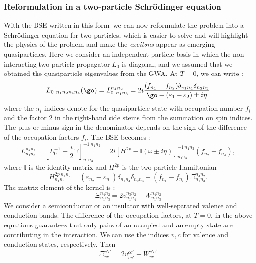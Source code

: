 \subsubsection{Reformulation in a two-particle Schrödinger equation}
With the \gls{BSE} written in this form, we can now reformulate the problem into a Schrödinger equation for two particles, which is easier to solve and will highlight the physics of the problem and make the \textit{excitons} appear as emerging quasiparticles. Here we consider an independent-particle basis in which the non-interacting two-particle propagator $L_0$ is diagonal, and we assumed that we obtained the quasiparticle eigenvalues from the \gls{GWA}. At $T=0$, we can write :
\begin{equation}
	L_{0\ n_1n_2n_3n_4}(\go) = L_{0\ n_1n_3}^{n_4n_2} = 2 i \frac{(f_{n_1} - f_{n_2}) \delta_{n_1n_4}\delta_{n_2n_3}}{\go - (\varepsilon_1 - \varepsilon_2) \pm i\eta}
\end{equation}
where the $n_i$ indices denote for the quasiparticle state with occupation number $f_i$ and the factor 2 in the right-hand side stems from the summation on spin indices. The plus or minus sign in the denominator depends on the sign of the difference of the occupation factors $f_i$. The \gls{BSE} becomes :
\begin{equation}
	L_{n_1n_3}^{n_4n_2} = \left[ L_0^{-1} + \frac{i}{2}\Xi\right]^{-1\ n_4n_2}_{n_1n_3} = 2i \left[ H^{2p} - \mathbb{I}(\omega \pm i\eta) \right]^{-1\ n_4n_2}_{n_1n_3}(f_{n_2} - f_{n_4}),
\end{equation}
where $\mathbb{I}$ is the identity matrix and $H^{2p}$ is the two-particle Hamiltonian 
\begin{equation}
	H^{2p\ n_4n_2}_{n_1n_3} = (\varepsilon_{n_2} - \varepsilon_{n_1}) \delta_{n_1n_4}\delta_{n_2n_3} + (f_{n_1} - f_{n_3}) \Xi_{n_1n_3}^{n_4n_2}.
\end{equation}
The matrix element of the kernel is :
\begin{equation}
	\Xi_{n_1n_3}^{n_4n_2} = 2v_{n_1n_4}^{n_3n_2} - W_{n_1n_3}^{n_4n_2}
\end{equation}
We consider a semiconductor or an insulator with well-separated valence and conduction bands. The difference of the occupation factors, at $T=0$, in the above equations guarantees that only pairs of an occupied and an empty state are contributing in the interaction. We can use the indices $v,c$ for valence and conduction states, respectively. Then
\begin{equation}
	\Xi^{v'c'}_{vc} = 2v^{cc'}_{vv'} - W^{v'c'}_{vc}
\end{equation}
